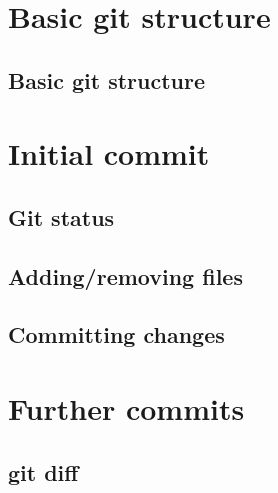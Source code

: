 \documentclass[10pt,a4paper]{beamer}
\begin{document}
\begin{frame}

\end{frame}


\section{Basic git structure}
\subsection{Basic git structure}
\begin{frame}

\end{frame}


\section{Initial commit}
\begin{frame}
\end{frame}

\subsection{Git status}
\begin{frame}

\end{frame}

\subsection{Adding/removing files}
\begin{frame}

\end{frame}

\subsection{Committing changes}
\begin{frame}

\end{frame}


\section{Further commits}

\subsection{git diff}
\begin{frame}

\end{frame}
\end{document}
